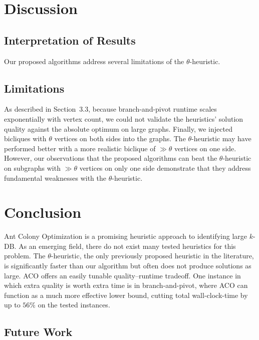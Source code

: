 \documentclass[conference]{IEEEtran}
\begin{document}


\section{Discussion}

\subsection{Interpretation of Results}

Our proposed algorithms address several limitations of the $\theta$-heuristic. 

\subsection{Limitations}

As described in Section~3.3, because branch-and-pivot runtime scales exponentially with vertex count, we could not validate the heuristics' solution quality against the absolute optimum on large graphs. Finally, we injected bicliques with $\theta$ vertices on both sides into the graphs. The $\theta$-heuristic may have performed better with a more realistic biclique of $\gg \theta$ vertices on one side. However, our observations that the proposed algorithms can beat the $\theta$-heuristic on subgraphs with $\gg \theta$ vertices on only one side demonstrate that they address fundamental weaknesses with the $\theta$-heuristic.

\section{Conclusion}

Ant Colony Optimization is a promising heuristic approach to identifying large $k$-DB. As an emerging field, there do not exist many tested heuristics for this problem. The $\theta$-heuristic, the only previously proposed heuristic in the literature, is significantly faster than our algorithm but often does not produce solutions as large. ACO offers an easily tunable quality--runtime tradeoff. One instance in which extra quality is worth extra time is in branch-and-pivot, where ACO can function as a much more effective lower bound, cutting total wall-clock-time by up to $56\%$ on the tested instances.

\subsection{Future Work}
\end{document}
